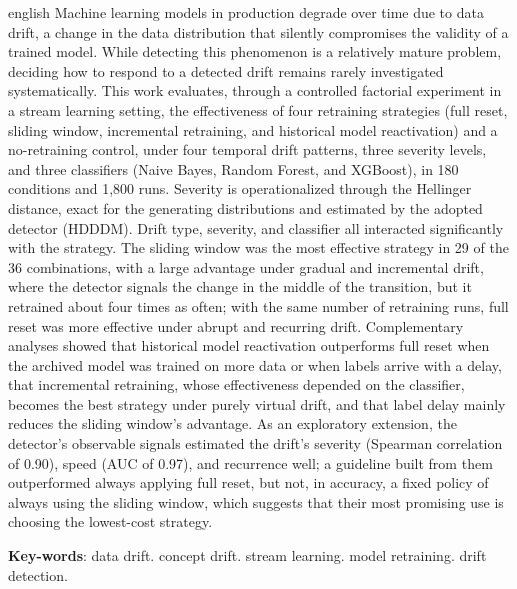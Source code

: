 \begin{resumo}[Abstract]
 \begin{otherlanguage*}{english}
Machine learning models in production degrade over time due to data drift,
a change in the data distribution that silently compromises the validity of
a trained model. While detecting this phenomenon is a relatively mature
problem, deciding how to respond to a detected drift remains rarely
investigated systematically. This work evaluates, through a controlled
factorial experiment in a stream learning setting, the effectiveness of
four retraining strategies (full reset, sliding window, incremental
retraining, and historical model reactivation) and a no-retraining control,
under four temporal drift patterns, three severity levels, and three
classifiers (Naive Bayes, Random Forest, and XGBoost), in 180 conditions and
1,800 runs. Severity is operationalized through the Hellinger distance,
exact for the generating distributions and estimated by the adopted
detector (HDDDM). Drift type, severity, and classifier all interacted
significantly with the strategy. The sliding window was the most effective
strategy in 29 of the 36 combinations, with a large advantage under gradual
and incremental drift, where the detector signals the change in the middle
of the transition, but it retrained about four times as often; with the
same number of retraining runs, full reset was more effective under abrupt
and recurring drift. Complementary analyses showed that historical model
reactivation outperforms full reset when the archived model was trained on
more data or when labels arrive with a delay, that incremental retraining,
whose effectiveness depended on the classifier, becomes the best strategy
under purely virtual drift, and that label delay mainly reduces the sliding
window's advantage. As an exploratory extension, the detector's
observable signals estimated the drift's severity (Spearman correlation of
0.90), speed (AUC of 0.97), and recurrence well; a guideline built from them
outperformed always applying full reset, but not, in accuracy, a fixed
policy of always using the sliding window, which suggests that their most
promising use is choosing the lowest-cost strategy.
   \vspace{\onelineskip}

\noindent \textbf{Key-words}: data drift. concept drift. stream learning.
model retraining. drift detection.
 \end{otherlanguage*}
\end{resumo}